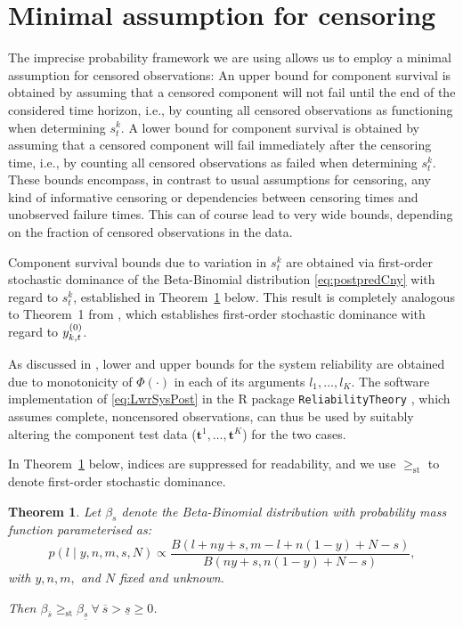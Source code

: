 \documentclass[12pt, a4paper]{elsarticle}
\newtheorem{theorem}{Theorem}
\newcommand{\bs}[1]{\boldsymbol{#1}}
\renewcommand{\vec}[1]{{\bs#1}}
\newcommand{\ul}[1]{\underline{#1}}
\newcommand{\ol}[1]{\overline{#1}}
\begin{document}
\section{Minimal assumption for censoring}

The imprecise probability framework we are using
allows us to employ a minimal assumption for censored observations:
An upper bound for component survival is obtained by assuming that 
a censored component will not fail until the end of the considered time horizon,
i.e., by counting all censored observations as functioning when determining $s^k_t$.
A lower bound for component survival is obtained by assuming that
a censored component will fail immediately after the censoring time,
i.e., by counting all censored observations as failed when determining $s^k_t$.
These bounds encompass, in contrast to usual assumptions for censoring,
any kind of informative censoring or dependencies between censoring times and unobserved failure times. 
This can of course lead to very wide bounds, depending on the fraction of censored observations in the data.

Component survival bounds due to variation in $s^k_t$ are obtained via first-order stochastic dominance
of the Beta-Binomial distribution \eqref{eq:postpredCny} with regard to $s^k_t$,
established in Theorem~\ref{thm:s} below.
This result is completely analogous to Theorem~1 from \citet{2016:bayessurvsignsets},
which establishes first-order stochastic dominance with regard to $y^{(0)}_{k,t}$.

As discussed in \citet[\S 6]{2016:bayessurvsignsets},
lower and upper bounds for the system reliability
are obtained due to monotonicity of $\Phi(\cdot)$
in each of its arguments $l_1,\ldots,l_K$.
The software implementation of \eqref{eq:LwrSysPost} in the \textsf{R}
\citep{R} package \texttt{ReliabilityTheory} \citep{2015:aslett-RT},
which assumes complete, noncensored observations,
can thus be used by suitably altering the component test data ($\vec{t}^1, \ldots, \vec{t}^K$)
for the two cases.

In Theorem~\ref{thm:s} below, indices are suppressed for readability,
and we use $\ge_{\mathrm{st}}$ to denote first-order stochastic dominance.

\begin{theorem}
  \label{thm:s}
  Let $\beta_s$ denote the Beta-Binomial distribution with probability mass function parameterised as:
  \[ p(l \mid y, n, m, s, N) \propto \frac{B(l + ny + s, m - l + n(1-y) + N - s)}{B(ny + s, n(1-y) + N - s)}, \]
  with $y, n, m,$ and $N$ fixed and unknown.
  
  Then $\beta_{\ol{s}} \ge_{\mathrm{st}} \beta_{\ul{s}} \ \forall \ \ol{s} > \ul{s} \ge 0$.
\end{theorem}
\end{document}
